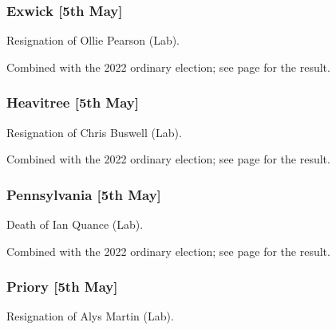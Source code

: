 \documentclass[a4paper,openany]{book}
\begin{document}
\begin{resultsiii}
\subsubsection*{Exwick \hspace*{\fill}\nolinebreak[1]%
	\enspace\hspace*{\fill}
	[5th May]}


Resignation of Ollie Pearson (Lab).

Combined with the 2022 ordinary election; see page \pageref{ExeterExwick} for the result.

\subsubsection*{Heavitree \hspace*{\fill}\nolinebreak[1]%
	\enspace\hspace*{\fill}
	[5th May]}


Resignation of Chris Buswell (Lab).

Combined with the 2022 ordinary election; see page \pageref{ExeterHeavitree} for the result.

\subsubsection*{Pennsylvania \hspace*{\fill}\nolinebreak[1]%
	\enspace\hspace*{\fill}
	[5th May]}


Death of Ian Quance (Lab).

Combined with the 2022 ordinary election; see page \pageref{ExeterPennsylvania} for the result.

\subsubsection*{Priory \hspace*{\fill}\nolinebreak[1]%
	\enspace\hspace*{\fill}
	[5th May]}


Resignation of Alys Martin (Lab).


\end{resultsiii}
\end{document}
